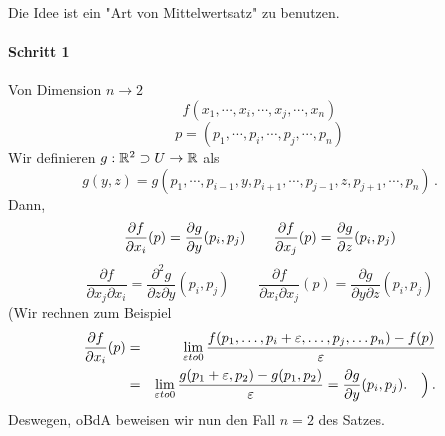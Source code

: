 \begin{Bew}
  Die Idee ist ein "Art von Mittelwertsatz" zu benutzen.
  \paragraph{Schritt 1} Von Dimension $n\to 2$
  \[f(x_1,\cdots,x_i,\cdots,x_j,\cdots,x_n)\]
  \[p=(p_1,\cdots,p_i,\cdots,p_j,\cdots,p_n)\]
Wir definieren $g:\mathbb{R}^2 \supset U\rightarrow\mathbb{R}$ als
  \[g(y,z)=g(p_1,\cdots,p_{i-1},y,p_{i+1},\cdots,p_{j-1},z,p_{j+1},\cdots,p_n)\, .\]
Dann,
  \[\dfrac{\partial f}{\partial x_i}(p)=\dfrac{\partial g}{\partial y}(p_i,p_j)\qquad \dfrac{\partial f}{\partial x_j}(p)=\dfrac{\partial g}{\partial z}(p_i,p_j)\]
  \[\frac{\partial f}{\partial x_j\partial x_i}=\frac{\partial^2 g}{\partial z\partial y}(p_i,p_j)
\qquad \frac{\partial f}{\partial x_i\partial x_j}(p)=\frac{\partial g}{\partial y \partial z}(p_i,p_j)\]
(Wir rechnen zum Beispiel 
  \begin{eqnarray*}
\dfrac{\partial f}{\partial x_i}(p)& =& \lim_{\varepsilon to 0} \frac{f(p_1, \ldots, p_i+\varepsilon, \ldots, p_j, \ldots p_n)
- f (p)}{\varepsilon}\\ 
&=& \lim_{\varepsilon to 0} \frac{g(p_1+\varepsilon, p_2) - g (p_1, p_2)}{\varepsilon}
= \frac{\partial g}{\partial y} (p_i, p_j). \quad\Big)\, .
\end{eqnarray*}
Deswegen, oBdA beweisen wir nun den Fall $n=2$ des Satzes.

\medskip


\end{Bew}
